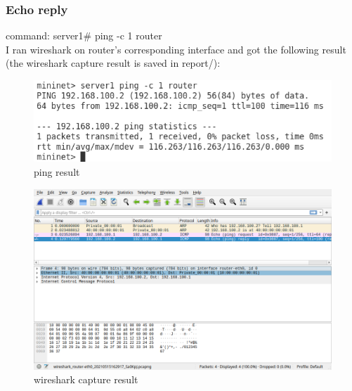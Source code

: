 \documentclass[12pt,a4paper,UTF8]{article}
\begin{document}
\subsubsection{Echo reply}
command: server1\# ping -c 1 router \\
I ran wireshark on router's corresponding interface and got the following result (the wireshark capture result is saved in report/):
\begin{figure}[htbp]
	\centering
	\includegraphics[width=\textwidth]{3}
	\caption{ping result}
\end{figure}
\begin{figure}[htbp]
	\centering
	\includegraphics[width=\textwidth]{4}
	\caption{wireshark capture result}
\end{figure}
\end{document}
